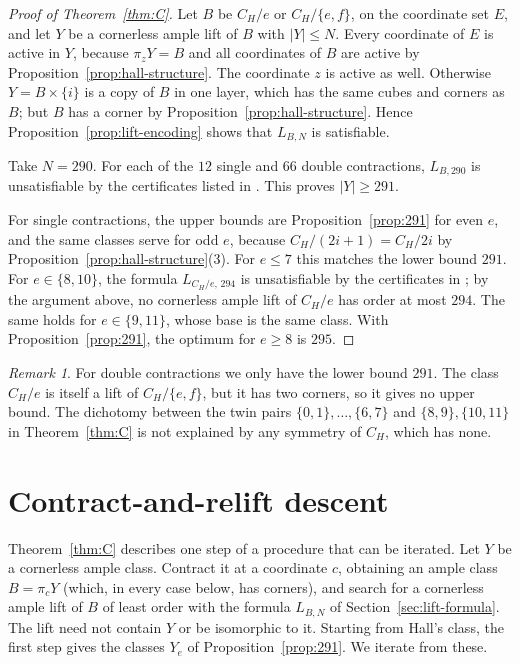\documentclass[11pt]{article}
\numberwithin{equation}{section}
\theoremstyle{definition}
\theoremstyle{remark}
\newtheorem{remark}[theorem]{Remark}
\begin{document}
\begin{proof}[Proof of Theorem~\ref{thm:C}]
Let \(B\) be \(C_H/e\) or \(C_H/\{e,f\}\), on the coordinate set \(E\), and let
\(Y\) be a cornerless ample lift of \(B\) with \(|Y|\le N\).  Every
coordinate of \(E\) is active in \(Y\), because \(\pi_zY=B\) and all
coordinates of \(B\) are active by Proposition~\ref{prop:hall-structure}.
The coordinate \(z\) is active as well.  Otherwise \(Y=B\times\{i\}\) is a
copy of \(B\) in one layer, which has the same cubes and corners as \(B\);
but \(B\) has a corner by Proposition~\ref{prop:hall-structure}.  Hence
Proposition~\ref{prop:lift-encoding} shows that \(L_{B,N}\) is satisfiable.

Take \(N=290\).  For each of the \(12\) single and \(66\) double contractions,
\(L_{B,290}\) is unsatisfiable by the certificates listed in
.  This proves \(|Y|\ge291\).

For single contractions, the upper bounds are
Proposition~\ref{prop:291} for even \(e\), and the same classes serve for
odd \(e\), because \(C_H/(2i+1)=C_H/2i\) by
Proposition~\ref{prop:hall-structure}(3).  For \(e\le7\) this matches the
lower bound \(291\).  For \(e\in\{8,10\}\), the formula \(L_{C_H/e,\,294}\) is
unsatisfiable by the certificates in ;
by the argument above, no cornerless ample lift of \(C_H/e\) has order at
most \(294\).  The same holds for \(e\in\{9,11\}\), whose base is the
same class.  With Proposition~\ref{prop:291}, the optimum for \(e\ge8\) is
\(295\).
\end{proof}

\begin{remark}
\label{rem:hall-doubles}
For double contractions we only have the lower bound \(291\).  The class
\(C_H/e\) is itself a lift of \(C_H/\{e,f\}\), but it has two corners, so it
gives no upper bound.  The dichotomy between the twin pairs
\(\{0,1\},\dots,\{6,7\}\) and \(\{8,9\},\{10,11\}\) in Theorem~\ref{thm:C} is
not explained by any symmetry of \(C_H\), which has none.
\end{remark}

\section{Contract-and-relift descent}
\label{sec:descent}

Theorem~\ref{thm:C} describes one step of a procedure that can be
iterated.  Let \(Y\) be a cornerless ample class.  Contract it at a coordinate
\(c\), obtaining an ample class \(B=\pi_cY\) (which, in every case below, has
corners), and search for a cornerless ample lift of \(B\) of least order with
the formula \(L_{B,N}\) of Section~\ref{sec:lift-formula}.  The lift need not
contain \(Y\) or be isomorphic to it.  Starting from Hall's class, the first
step gives the classes \(Y_e\) of Proposition~\ref{prop:291}.  We iterate
from these.
\end{document}
